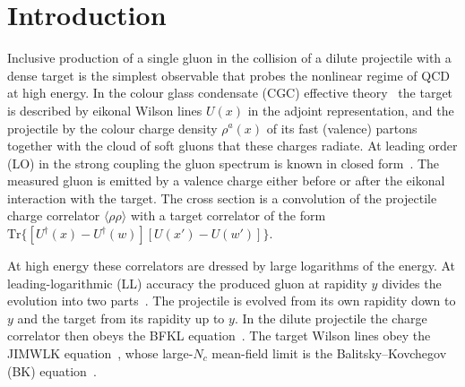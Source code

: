 \documentclass[aps,prd,onecolumn,superscriptaddress,nofootinbib,floatfix,longbibliography,11pt]{revtex4-2}
\numberwithin{equation}{section}
\newcommand{\Ud}{U^{\dagger}}
\newcommand{\Tr}{\mathrm{Tr}}
\begin{document}
\tableofcontents

\section{Introduction}\label{sec:intro}

Inclusive production of a single gluon in the collision of a dilute projectile with a dense target is the simplest observable that probes the nonlinear regime of QCD at high energy. In the colour glass condensate (CGC) effective theory~\cite{McLerran:1993ni,McLerran:1993ka} the target is described by eikonal Wilson lines $U(x)$ in the adjoint representation, and the projectile by the colour charge density $\rho^a(x)$ of its fast (valence) partons together with the cloud of soft gluons that these charges radiate. At leading order (LO) in the strong coupling the gluon spectrum is known in closed form~\cite{Kovchegov:1998bi,Kovchegov:2001sc,Dumitru:2001ux,Blaizot:2004wu,Kovner:2006wr}. The measured gluon is emitted by a valence charge either before or after the eikonal interaction with the target. The cross section is a convolution of the projectile charge correlator $\langle\rho\rho\rangle$ with a target correlator of the form $\Tr\{[\Ud(x)-\Ud(w)][U(x')-U(w')]\}$.

At high energy these correlators are dressed by large logarithms of the energy. At leading-logarithmic (LL) accuracy the produced gluon at rapidity $y$ divides the evolution into two parts~\cite{Kovchegov:2001sc,Baier:2005dv,Kovner:2006ge,Kovner:2006wr,Gelis:2008rw}. The projectile is evolved from its own rapidity down to $y$ and the target from its rapidity up to $y$. In the dilute projectile the charge correlator then obeys the BFKL equation~\cite{Kuraev:1977fs,Balitsky:1978ic}. The target Wilson lines obey the JIMWLK equation~\cite{JalilianMarian:1997jx,JalilianMarian:1997gr,JalilianMarian:1998cb,Kovner:2000pt,Weigert:2000gi,Iancu:2000hn,Ferreiro:2001qy}, whose large-$N_c$ mean-field limit is the Balitsky--Kovchegov (BK) equation~\cite{Balitsky:1995ub,Kovchegov:1999yj}.
\end{document}
